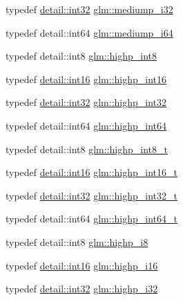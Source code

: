 \begin{DoxyCompactItemize}
\item 
typedef \hyperlink{stb__image_8c_a43d43196463bde49cb067f5c20ab8481}{detail\+::int32} \hyperlink{group__gtc__type__precision_ga5e00ec824eb55968a6b6496f294d8c07}{glm\+::mediump\+\_\+i32}
\item 
typedef detail\+::int64 \hyperlink{group__gtc__type__precision_ga90fedf6c701ffbe00535156715e50787}{glm\+::mediump\+\_\+i64}
\item 
typedef detail\+::int8 \hyperlink{group__gtc__type__precision_ga57c86999e666760c304453f9bfdc09d1}{glm\+::highp\+\_\+int8}
\item 
typedef \hyperlink{stb__image_8c_a259fa4834387bd68627ddf37bb3ebdb9}{detail\+::int16} \hyperlink{group__gtc__type__precision_gaf0430ed80e88c0d1dfbe47f359659c81}{glm\+::highp\+\_\+int16}
\item 
typedef \hyperlink{stb__image_8c_a43d43196463bde49cb067f5c20ab8481}{detail\+::int32} \hyperlink{group__gtc__type__precision_gaa2045c92b9553d463191af6a20e997bb}{glm\+::highp\+\_\+int32}
\item 
typedef detail\+::int64 \hyperlink{group__gtc__type__precision_ga7ffb27943e9569800979081bc548621c}{glm\+::highp\+\_\+int64}
\item 
typedef detail\+::int8 \hyperlink{group__gtc__type__precision_ga417701b99e6e7992f35ab2ef694f88b2}{glm\+::highp\+\_\+int8\+\_\+t}
\item 
typedef \hyperlink{stb__image_8c_a259fa4834387bd68627ddf37bb3ebdb9}{detail\+::int16} \hyperlink{group__gtc__type__precision_ga07d318d61472e75238e53b9642227672}{glm\+::highp\+\_\+int16\+\_\+t}
\item 
typedef \hyperlink{stb__image_8c_a43d43196463bde49cb067f5c20ab8481}{detail\+::int32} \hyperlink{group__gtc__type__precision_ga783d077a513c1f475f6cdb406b4238c3}{glm\+::highp\+\_\+int32\+\_\+t}
\item 
typedef detail\+::int64 \hyperlink{group__gtc__type__precision_ga0f5186bde44471133b08057cae8a51ac}{glm\+::highp\+\_\+int64\+\_\+t}
\item 
typedef detail\+::int8 \hyperlink{group__gtc__type__precision_ga8b9eb0b24cce7f14478bfcacb53ce839}{glm\+::highp\+\_\+i8}
\item 
typedef \hyperlink{stb__image_8c_a259fa4834387bd68627ddf37bb3ebdb9}{detail\+::int16} \hyperlink{group__gtc__type__precision_gaa04399853952dbce29cb62e2432f350a}{glm\+::highp\+\_\+i16}
\item 
typedef \hyperlink{stb__image_8c_a43d43196463bde49cb067f5c20ab8481}{detail\+::int32} \hyperlink{group__gtc__type__precision_ga197d19b585222da57d70238a5cfc2be8}{glm\+::highp\+\_\+i32}

\end{DoxyCompactItemize}
